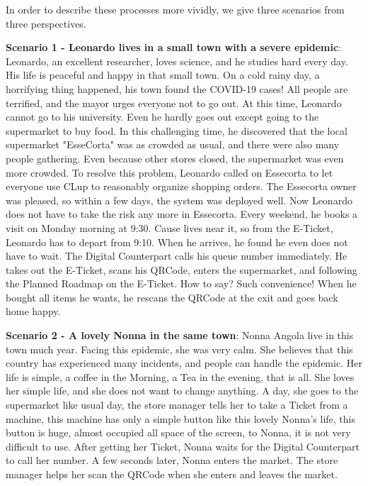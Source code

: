 \documentclass[a4paper,12pt]{report}
\begin{document}
In order to describe these processes more vividly, we give three scenarios from three perspectives. 

\textbf{Scenario 1 - Leonardo lives in a small town with a severe epidemic}: Leonardo, an excellent researcher, loves science, and he studies hard every day. His life is peaceful and happy in that small town. On a cold rainy day, a horrifying thing happened, his town found the COVID-19 cases! All people are terrified, and the mayor urges everyone not to go out. At this time, Leonardo cannot go to his university. Even he hardly goes out except going to the supermarket to buy food. In this challenging time, he discovered that the local supermarket "EsseCorta" was as crowded as usual, and there were also many people gathering. Even because other stores closed, the supermarket was even more crowded. To resolve this problem, Leonardo called on Essecorta to let everyone use CLup to reasonably organize shopping orders. The Essecorta owner was pleased, so within a few days, the system was deployed well.
Now Leonardo does not have to take the risk any more in Essecorta. Every weekend, he books a visit on Monday morning at 9:30. Cause lives near it, so from the E-Ticket, Leonardo has to depart from 9:10. When he arrives, he found he even does not have to wait. The Digital Counterpart calls his queue number immediately. He takes out the E-Ticket, scans his QRCode, enters the supermarket, and following the Planned Roadmap on the E-Ticket. How to say? Such convenience! When he bought all items he wants, he rescans the QRCode at the exit and goes back home happy.


\textbf{Scenario 2 - A lovely Nonna in the same town}: Nonna Angola live in this town much year. Facing this epidemic, she was very calm. She believes that this country has experienced many incidents, and people can handle the epidemic. Her life is simple, a coffee in the Morning, a Tea in the evening, that is all. She loves her simple life, and she does not want to change anything. A day, she goes to the supermarket like usual day, the store manager tells her to take a Ticket from a machine, this machine has only a simple button like this lovely Nonna's life, this button is huge, almost occupied all space of the screen, to Nonna, it is not very difficult to use. After getting her Ticket, Nonna waits for the Digital Counterpart to call her number. A few seconds later, Nonna enters the market. The store manager helps her scan the QRCode when she enters and leaves the market.
\end{document}
